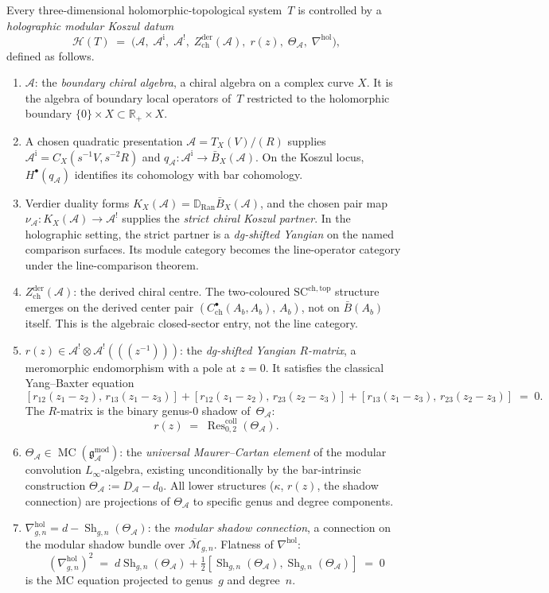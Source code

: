 \documentclass[11pt]{report}
\theoremstyle{definition}
\theoremstyle{remark}
\providecommand{\cA}{\mathcal{A}}
\providecommand{\cM}{\mathcal{M}}
\providecommand{\barB}{\bar{B}}
\providecommand{\Ran}{\mathrm{Ran}}
\providecommand{\SCchtop}{\mathrm{SC}^{\mathrm{ch,top}}}
\numberwithin{equation}{section}
\begin{document}
Every three-dimensional holomorphic-topological system~$T$ is
controlled by a \emph{holographic modular Koszul datum}
\[
\mathcal H(T)
\;=\;
\bigl(\cA,\;\cA^{\mathrm i},\;\cA^!,\;
Z^{\mathrm{der}}_{\mathrm{ch}}(\cA),\;r(z),\;\Theta_\cA,\;\nabla^{\mathrm{hol}}\bigr),
\]
defined as follows.
\begin{enumerate}[label=(\roman*)]
\item $\cA$: the \emph{boundary chiral algebra}, a chiral algebra
 on a complex curve $X$. It is the algebra of boundary local
 operators of~$T$ restricted to the holomorphic boundary
 $\{0\}\times X\subset\mathbb R_+\times X$.
\item A chosen quadratic presentation
 $\cA=T_X(V)/(R)$ supplies
 $\cA^{\mathrm i}=C_X(s^{-1}V,s^{-2}R)$ and
 $q_\cA\colon\cA^{\mathrm i}\to\barB_X(\cA)$.  On the Koszul locus,
 $H^\bullet(q_\cA)$ identifies its cohomology with bar cohomology.
\item Verdier duality forms
 $K_X(\cA)=\mathbb D_{\Ran}\barB_X(\cA)$, and the chosen pair map
 $\nu_\cA\colon K_X(\cA)\to\cA^!$ supplies the
 \emph{strict chiral Koszul partner}. In the holographic setting, the
 strict partner is a \emph{dg-shifted Yangian} on the named comparison
 surfaces. Its module category becomes the line-operator category
 under the line-comparison theorem.
\item $Z^{\mathrm{der}}_{\mathrm{ch}}(\cA)$: the derived chiral centre.
 The two-coloured $\SCchtop$ structure emerges on the derived center
 pair $(C^\bullet_{\mathrm{ch}}(A_b,A_b),\, A_b)$, not on
 $\barB(A_b)$ itself. This is the algebraic closed-sector entry, not
 the line category.
\item $r(z)\in\cA^!\otimes\cA^!((\!( z^{-1})\!))$: the
 \emph{dg-shifted Yangian $R$-matrix}, a meromorphic endomorphism
 with a pole at $z=0$. It satisfies the classical Yang--Baxter
 equation
 \[
 [r_{12}(z_1{-}z_2),\,r_{13}(z_1{-}z_3)]
 +[r_{12}(z_1{-}z_2),\,r_{23}(z_2{-}z_3)]
 +[r_{13}(z_1{-}z_3),\,r_{23}(z_2{-}z_3)]
 \;=\;0.
 \]
 The $R$-matrix is the binary genus-$0$ shadow of~$\Theta_\cA$:
 \[
 r(z)\;=\;\operatorname{Res}^{\mathrm{coll}}_{0,2}(\Theta_\cA).
 \]
\item $\Theta_\cA\in\operatorname{MC}(\mathfrak g^{\mathrm{mod}}_\cA)$:
 the \emph{universal Maurer--Cartan element} of the modular
 convolution $L_\infty$-algebra, existing unconditionally by the
 bar-intrinsic construction $\Theta_\cA:=D_\cA-d_0$. All lower
 structures ($\kappa$, $r(z)$, the shadow connection) are
 projections of $\Theta_\cA$ to specific genus and degree components.
\item $\nabla^{\mathrm{hol}}_{g,n}=d-\operatorname{Sh}_{g,n}(\Theta_\cA)$:
 the \emph{modular shadow connection}, a connection on the modular
 shadow bundle over $\overline{\cM}_{g,n}$. Flatness of
 $\nabla^{\mathrm{hol}}$:
 \[
 (\nabla^{\mathrm{hol}}_{g,n})^2
 \;=\;
 d\operatorname{Sh}_{g,n}(\Theta_\cA)
 +\tfrac12[\operatorname{Sh}_{g,n}(\Theta_\cA),
 \operatorname{Sh}_{g,n}(\Theta_\cA)]
 \;=\;0
 \]
 is the MC equation projected to genus~$g$ and degree~$n$.
\end{enumerate}
\end{document}
